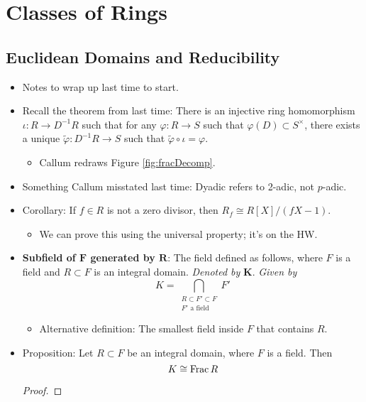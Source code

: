 \documentclass[../notes.tex]{subfiles}
\begin{document}
\chapter{Classes of Rings}
\section{Euclidean Domains and Reducibility}
\begin{itemize}
    \item {}Notes to wrap up last time to start.
    \item Recall the theorem from last time: There is an injective ring homomorphism $\iota:R\to D^{-1}R$ such that for any $\varphi:R\to S$ such that $\varphi(D)\subset S^\times$, there exists a unique $\tilde{\varphi}:D^{-1}R\to S$ such that $\tilde{\varphi}\circ\iota=\varphi$.
    \begin{itemize}
        \item Callum redraws Figure \ref{fig:fracDecomp}.
    \end{itemize}
    \item Something Callum misstated last time: Dyadic refers to 2-adic, not $p$-adic.
    \item Corollary: If $f\in R$ is not a zero divisor, then $R_f\cong R[X]/(fX-1)$.
    \begin{itemize}
        \item We can prove this using the universal property; it's on the HW.
    \end{itemize}
    \item \textbf{Subfield of $\bm{F}$ generated by $\bm{R}$}: The field defined as follows, where $F$ is a field and $R\subset F$ is an integral domain. \emph{Denoted by} $\bm{K}$. \emph{Given by}
    \begin{equation*}
        K = \bigcap_{\substack{R\subset F'\subset F\\F'\text{ a field}}}F'
    \end{equation*}
    \begin{itemize}
        \item Alternative definition: The smallest field inside $F$ that contains $R$.
    \end{itemize}
    \item Proposition: Let $R\subset F$ be an integral domain, where $F$ is a field. Then
    \begin{equation*}
        K \cong \operatorname{Frac} R
    \end{equation*}
    \begin{proof}

\end{proof}
\end{itemize}
\end{document}
